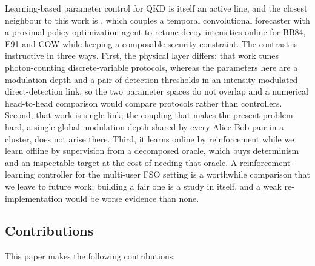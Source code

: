 Learning-based parameter control for QKD is itself an active line, and the closest neighbour to this work is \cite{mohamed2026aml}, which couples a temporal convolutional forecaster with a proximal-policy-optimization agent to retune decoy intensities online for BB84, E91 and COW while keeping a composable-security constraint. The contrast is instructive in three ways. First, the physical layer differs: that work tunes photon-counting discrete-variable protocols, whereas the parameters here are a modulation depth and a pair of detection thresholds in an intensity-modulated direct-detection link, so the two parameter spaces do not overlap and a numerical head-to-head comparison would compare protocols rather than controllers. Second, that work is single-link; the coupling that makes the present problem hard, a single global modulation depth shared by every Alice-Bob pair in a cluster, does not arise there. Third, it learns online by reinforcement while we learn offline by supervision from a decomposed oracle, which buys determinism and an inspectable target at the cost of needing that oracle. A reinforcement-learning controller for the multi-user FSO setting is a worthwhile comparison that we leave to future work; building a fair one is a study in itself, and a weak re-implementation would be worse evidence than none.

\subsection{Contributions}

This paper makes the following contributions:

